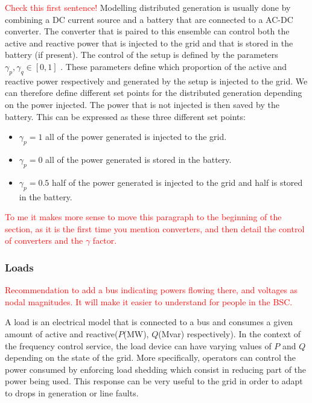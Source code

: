 \documentclass{article}
\begin{document}
\textcolor{red}{Check this first sentence!}
Modelling distributed generation is usually done by combining a DC current source and a battery that are connected to a AC-DC converter. The converter that is paired to this ensemble can control both the active and reactive power that is injected to the grid and that is stored in the battery (if present). The control of the setup is defined by the parameters $\gamma_p, \gamma_q \in [0,1]$ . These parameters define which proportion of the active and reactive power respectively and generated by the setup is injected to the grid. We can therefore define different set points for the distributed generation depending on the power injected. The power that is not injected is then saved by the battery. This can be expressed as these three different set points:

\begin{itemize}
    \item $\gamma_p = 1$ all of the power generated is injected to the grid.
    \item $\gamma_p = 0$ all of the power generated is stored in the battery.
    \item $\gamma_p = 0.5$ half of the power generated is injected to the grid and half is stored in the battery.
\end{itemize}

\textcolor{red}{To me it makes more sense to move this paragraph to the beginning of the section, as it is the first time you mention converters, and then detail the control of converters and the $\gamma$ factor.}

\subsubsection*{Loads}
\textcolor{red}{Recommendation to add a bus indicating powers flowing there, and voltages as nodal magnitudes. It will make it easier to understand for people in the BSC.}

A load is an electrical model that is connected to a bus and consumes a given amount of active and reactive($P$(MW),  $Q $(Mvar) respectively). In the context of the frequency control service, the load device can have varying values of $P$ and $Q$ depending on the state of the grid. More specifically, operators can control the power consumed by enforcing load shedding which consist in reducing part of the power being used. This response can be very useful to the grid in order to adapt to drops in generation or line faults.
\end{document}
